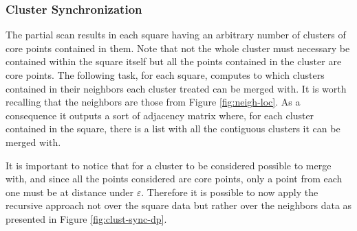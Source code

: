 \documentclass[10pt,journal,compsoc]{IEEEtran}
\begin{document}
\subsubsection{Cluster Synchronization} \label{subsec:cluster_sync}
The partial scan results in each square having an arbitrary number of clusters of core points contained in them. Note that not the whole cluster must necessary be contained within the square itself but all the points contained in the cluster are core points. The following task, for each square, computes to which clusters contained in their neighbors each cluster treated can be merged with. It is worth recalling that the neighbors are those from Figure \ref{fig:neigh-loc}. As a consequence it outputs a sort of adjacency matrix where, for each cluster contained in the square, there is a list with all the contiguous clusters it can be merged with.

It is important to notice that for a cluster to be considered possible to merge with, and since all the points considered are core points, only a point from each one must be at distance under $\varepsilon$. Therefore it is possible to now apply the recursive approach not over the square data but rather over the neighbors data as presented in Figure \ref{fig:clust-sync-dp}.
\end{document}
